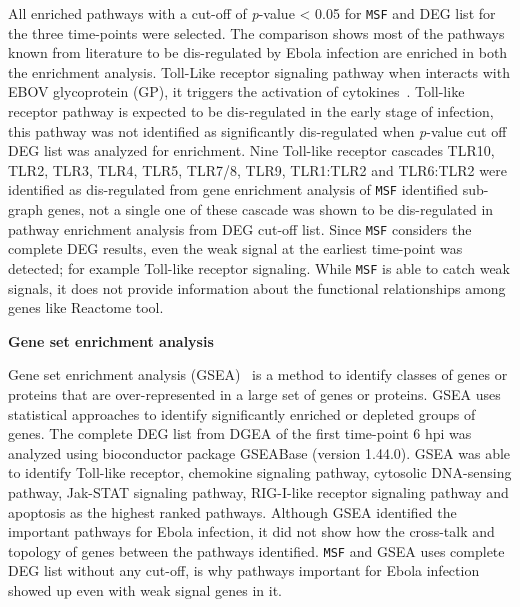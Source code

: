 \documentclass[10pt,a4paper,twocolumn]{article}
\begin{document}
	All enriched pathways with a cut-off of \textit{p}-value
        < 0.05 for \texttt{MSF} and DEG list for the
        three time-points were selected. The comparison shows most of
        the pathways known from literature to be dis-regulated by
        Ebola infection are enriched in both the enrichment
        analysis. Toll-Like receptor signaling pathway when interacts
        with EBOV glycoprotein (GP), it triggers the activation of
        cytokines~\cite{Olejnik}. Toll-like receptor pathway is
        expected to be dis-regulated in the early stage of infection,
        this pathway was not identified as significantly dis-regulated
        when \textit{p}-value cut off DEG list was analyzed for
        enrichment. Nine Toll-like receptor cascades TLR10, TLR2,
        TLR3, TLR4, TLR5, TLR7/8, TLR9, TLR1:TLR2 and TLR6:TLR2 were
        identified as dis-regulated from gene enrichment analysis of
        \texttt{MSF} identified sub-graph genes, not a single one of
        these cascade was shown to be dis-regulated in pathway
        enrichment analysis from DEG cut-off list. Since \texttt{MSF}
        considers the complete DEG results, even the weak signal at
        the earliest time-point was detected; for example Toll-like
        receptor signaling. While \texttt{MSF} is able to catch weak
        signals, it does not provide information about the functional
        relationships among genes like Reactome tool.
	
	\textbf{Gene set enrichment analysis }
	
	Gene set enrichment analysis (GSEA)~\cite{Subramanian15545}
        is a method to identify
        classes of genes or proteins that are over-represented in a
        large set of genes or proteins. GSEA uses statistical
        approaches to identify significantly enriched or depleted
        groups of genes. The complete DEG list from DGEA of the first
        time-point 6 hpi was analyzed using bioconductor package
        GSEABase (version 1.44.0). GSEA was able to identify
        Toll-like receptor, chemokine signaling pathway,
        cytosolic DNA-sensing pathway, Jak-STAT signaling pathway,
        RIG-I-like receptor signaling pathway and apoptosis as the
        highest ranked pathways. Although GSEA identified the
        important pathways for Ebola infection, it did not show how
        the cross-talk and topology of genes between the pathways
        identified. \texttt{MSF} and GSEA uses complete DEG list
        without any cut-off, is why pathways important for Ebola
        infection showed up even with weak signal genes in it.
	
\end{document}
